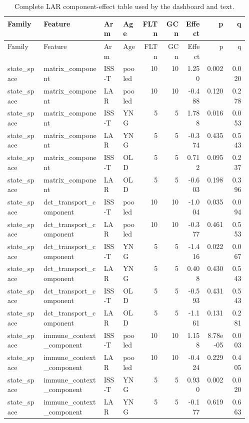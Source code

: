 \documentclass[11pt]{article}
\begin{document}
\begin{landscape}
\scriptsize
\setlength{\tabcolsep}{3pt}
\begin{longtable}{p{0.15\linewidth}p{0.25\linewidth}p{0.08\linewidth}p{0.08\linewidth}rrrrr}
\caption{Complete LAR component-effect table used by the dashboard and text.}\\
\toprule
Family & Feature & Arm & Age & FLT n & GC n & Effect & p & q \\
\midrule
\endfirsthead
\toprule
Family & Feature & Arm & Age & FLT n & GC n & Effect & p & q \\
\midrule
\endhead
state\_space & matrix\_component & ISS-T & pooled & 10 & 10 & 1.250 & 0.002 & 0.020 \\
state\_space & matrix\_component & LAR & pooled & 10 & 10 & -0.488 & 0.120 & 0.278 \\
state\_space & matrix\_component & ISS-T & YNG & 5 & 5 & 1.788 & 0.016 & 0.053 \\
state\_space & matrix\_component & LAR & YNG & 5 & 5 & -0.374 & 0.435 & 0.543 \\
state\_space & matrix\_component & ISS-T & OLD & 5 & 5 & 0.712 & 0.095 & 0.237 \\
state\_space & matrix\_component & LAR & OLD & 5 & 5 & -0.603 & 0.198 & 0.396 \\
state\_space & dct\_transport\_component & ISS-T & pooled & 10 & 10 & -1.004 & 0.035 & 0.094 \\
state\_space & dct\_transport\_component & LAR & pooled & 10 & 10 & -0.377 & 0.461 & 0.553 \\
state\_space & dct\_transport\_component & ISS-T & YNG & 5 & 5 & -1.416 & 0.022 & 0.067 \\
state\_space & dct\_transport\_component & LAR & YNG & 5 & 5 & 0.408 & 0.430 & 0.543 \\
state\_space & dct\_transport\_component & ISS-T & OLD & 5 & 5 & -0.593 & 0.431 & 0.543 \\
state\_space & dct\_transport\_component & LAR & OLD & 5 & 5 & -1.161 & 0.131 & 0.281 \\
state\_space & immune\_context\_component & ISS-T & pooled & 10 & 10 & 1.158 & 8.78e-05 & 0.003 \\
state\_space & immune\_context\_component & LAR & pooled & 10 & 10 & -0.424 & 0.229 & 0.405 \\
state\_space & immune\_context\_component & ISS-T & YNG & 5 & 5 & 0.930 & 0.002 & 0.020 \\
state\_space & immune\_context\_component & LAR & YNG & 5 & 5 & -0.177 & 0.619 & 0.663 \\

\end{longtable}
\end{landscape}
\end{document}
